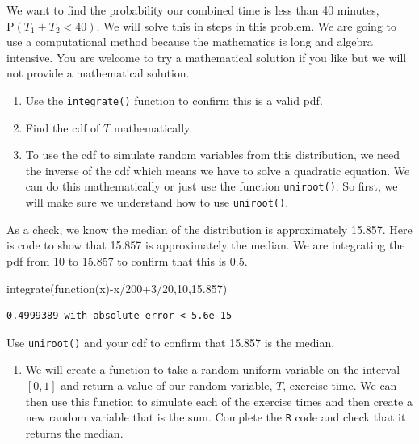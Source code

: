 \documentclass[
  letterpaper,
  DIV=11,
  numbers=noendperiod]{scrreprt}
\newenvironment{Shaded}{\begin{snugshade}}{\end{snugshade}}
\newcommand{\ControlFlowTok}[1]{\textcolor[rgb]{0.00,0.23,0.31}{#1}}
\newcommand{\DecValTok}[1]{\textcolor[rgb]{0.68,0.00,0.00}{#1}}
\newcommand{\FloatTok}[1]{\textcolor[rgb]{0.68,0.00,0.00}{#1}}
\newcommand{\FunctionTok}[1]{\textcolor[rgb]{0.28,0.35,0.67}{#1}}
\newcommand{\NormalTok}[1]{\textcolor[rgb]{0.00,0.23,0.31}{#1}}
\newcommand{\SpecialCharTok}[1]{\textcolor[rgb]{0.37,0.37,0.37}{#1}}
\providecommand{\tightlist}{%
  \setlength{\itemsep}{0pt}\setlength{\parskip}{0pt}}\usepackage{longtable,booktabs,array}
\begin{document}
We want to find the probability our combined time is less than 40
minutes, \(\mbox{P}(T_1 + T_2 < 40)\). We will solve this in steps in
this problem. We are going to use a computational method because the
mathematics is long and algebra intensive. You are welcome to try a
mathematical solution if you like but we will not provide a mathematical
solution.

\begin{enumerate}
\def\labelenumi{\alph{enumi}.}
\item
  Use the \texttt{integrate()} function to confirm this is a valid pdf.
\item
  Find the cdf of \(T\) mathematically.
\item
  To use the cdf to simulate random variables from this distribution, we
  need the inverse of the cdf which means we have to solve a quadratic
  equation. We can do this mathematically or just use the function
  \texttt{uniroot()}. So first, we will make sure we understand how to
  use \texttt{uniroot()}.
\end{enumerate}

As a check, we know the median of the distribution is approximately
15.857. Here is code to show that 15.857 is approximately the median. We
are integrating the pdf from 10 to 15.857 to confirm that this is 0.5.

\begin{Shaded}
\begin{Highlighting}[]
\FunctionTok{integrate}\NormalTok{(}\ControlFlowTok{function}\NormalTok{(x)}\SpecialCharTok{{-}}\NormalTok{x}\SpecialCharTok{/}\DecValTok{200}\SpecialCharTok{+}\DecValTok{3}\SpecialCharTok{/}\DecValTok{20}\NormalTok{,}\DecValTok{10}\NormalTok{,}\FloatTok{15.857}\NormalTok{)}
\end{Highlighting}
\end{Shaded}

\begin{verbatim}
0.4999389 with absolute error < 5.6e-15
\end{verbatim}

Use \texttt{uniroot()} and your cdf to confirm that 15.857 is the
median.

\begin{enumerate}
\def\labelenumi{\alph{enumi}.}
\setcounter{enumi}{3}
\tightlist
\item
  We will create a function to take a random uniform variable on the
  interval \([0,1]\) and return a value of our random variable, \(T\),
  exercise time. We can then use this function to simulate each of the
  exercise times and then create a new random variable that is the sum.
  Complete the \texttt{R} code and check that it returns the median.
\end{enumerate}
\end{document}
